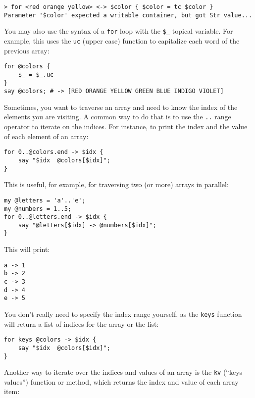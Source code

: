 \begin{verbatim}
> for <red orange yellow> <-> $color { $color = tc $color }
Parameter '$color' expected a writable container, but got Str value...
\end{verbatim}

You may also use the syntax of a {\tt for} loop with the 
\verb'$_' topical variable. For example, this uses the
{\tt uc} (upper case) function to capitalize each word of 
the previous array:

\begin{verbatim}
for @colors { 
    $_ = $_.uc 
}
say @colors; # -> [RED ORANGE YELLOW GREEN BLUE INDIGO VIOLET]
\end{verbatim}
%

Sometimes, you want to traverse an array and need to know the 
index of the elements you are visiting. A common way to do 
that is to use the \verb'..' range operator to iterate on 
the indices. For instance, to print the index and the value of each element of an array:

\begin{verbatim}
for 0..@colors.end -> $idx { 
    say "$idx  @colors[$idx]"; 
}
\end{verbatim}

This is useful, for example, for traversing two (or more) arrays 
in parallel:

\begin{verbatim}
my @letters = 'a'..'e';
my @numbers = 1..5;
for 0..@letters.end -> $idx { 
    say "@letters[$idx] -> @numbers[$idx]"; 
}
\end{verbatim}
%

This will print:
\begin{verbatim}
a -> 1
b -> 2
c -> 3
d -> 4
e -> 5
\end{verbatim}

You don't really need to specify the index range yourself, as 
the {\tt keys} function will return a list of indices for 
the array or the list:

\begin{verbatim}
for keys @colors -> $idx { 
    say "$idx  @colors[$idx]"; 
}
\end{verbatim}

Another way to iterate over the indices and values of an 
array is the {\tt kv} (``keys values'') function or method, 
which returns the index and value of each array item:

